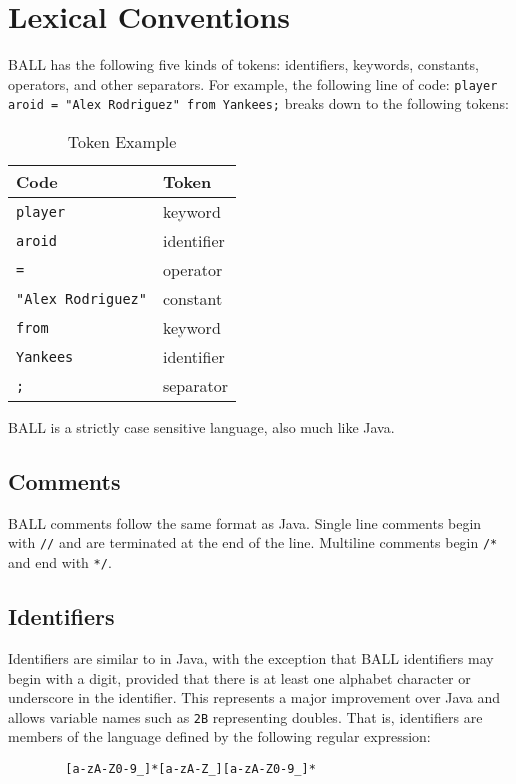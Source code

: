 
\section{Lexical Conventions} \label{lexical convention}
BALL has the following five kinds of tokens: identifiers, keywords, constants, operators, and other separators. For example, the following line of code: \texttt{player aroid = "Alex Rodriguez" from Yankees;} breaks down to the following tokens:

\begin{table}[htdp]
\begin{center}
\begin{tabular}{|l|l|}
\hline
Code & Token\\
\hline
\texttt{player} & keyword \\

\texttt{aroid} & identifier\\

\texttt{=} & operator\\

\texttt{"Alex Rodriguez"} & constant\\

\texttt{from} & keyword\\

\texttt{Yankees} & identifier\\

\texttt{;} & separator\\
\hline
\end{tabular}
\caption{Token Example}
\end{center}
\label{token example}
\end{table}
BALL is a strictly case sensitive language, also much like Java.

\subsection{Comments}
BALL comments follow the same format as Java. Single line comments begin with \texttt{//} and are terminated at the end of the line. Multiline comments begin \texttt{/*} and end with \texttt{*/}.
\subsection{Identifiers}
Identifiers are similar to in Java, with the exception that BALL identifiers may begin with a digit, provided that there is at least one alphabet character or underscore in the identifier. This represents a major improvement over Java and allows variable names such as \texttt{2B} representing doubles. That is, identifiers are members of the language defined by the following regular expression: 
\begin{verbatim}
        [a-zA-Z0-9_]*[a-zA-Z_][a-zA-Z0-9_]*
\end{verbatim}


